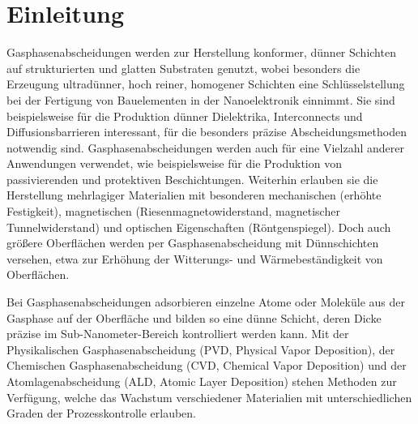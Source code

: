 \chapter{Einleitung}
\label{intro}

Gasphasenabscheidungen werden zur Herstellung konformer, dünner Schichten auf strukturierten und glatten Substraten genutzt, wobei besonders die Erzeugung ultradünner, hoch reiner, homogener Schichten eine Schlüsselstellung bei der Fertigung von Bauelementen in der Nanoelektronik einnimmt\cite{granneman_thin_1993}.
Sie sind beispielsweise für die Produktion dünner Dielektrika\cite{gordon_vapor_2001}, Interconnects\cite{waechtler_copper_2009} und Diffusionsbarrieren\cite{granneman_thin_1993,raaijmakers_low_1994} interessant, für die besonders präzise Abscheidungsmethoden notwendig sind.
Gasphasenabscheidungen werden auch für eine Vielzahl anderer Anwendungen verwendet, wie beispielsweise für die Produktion von passivierenden und protektiven Beschichtungen\cite{yun_passivation_2004,poodt_high-speed_2010,higashiwaki_algan/gan_2006}.
Weiterhin erlauben sie die Herstellung mehrlagiger Materialien mit besonderen mechanischen (erhöhte Festigkeit\cite{cammarata_nanoindentation_1990}), magnetischen (Riesenmagnetowiderstand\cite{peter_influence_2007,seyama_giant_1999,bird_giant_1995}, magnetischer Tunnelwiderstand\cite{sun_magnetic_2006}) und optischen Eigenschaften (Röntgenspiegel\cite{jankowski_subnanometer_1989}).
Doch auch größere Oberflächen werden per Gasphasenabscheidung mit Dünnschichten versehen, etwa zur Erhöhung der Witterungs- und Wärmebeständigkeit von Oberflächen\cite{mccurdy_successful_1999}.

Bei Gasphasenabscheidungen adsorbieren einzelne Atome oder Moleküle aus der Gasphase auf der Oberfläche und bilden so eine dünne Schicht, deren Dicke präzise im Sub-Nanometer-Bereich kontrolliert werden kann\cite{mattox_handbook_2010,pierson_handbook_1999}.
Mit der Physikalischen Gasphasenabscheidung (PVD, Physical Vapor Deposition), der Chemischen Gasphasenabscheidung (CVD, Chemical Vapor Deposition) und der Atomlagenabscheidung (ALD, Atomic Layer Deposition) stehen Methoden zur Verfügung, welche das Wachstum verschiedener Materialien mit unterschiedlichen Graden der Prozesskontrolle erlauben.

